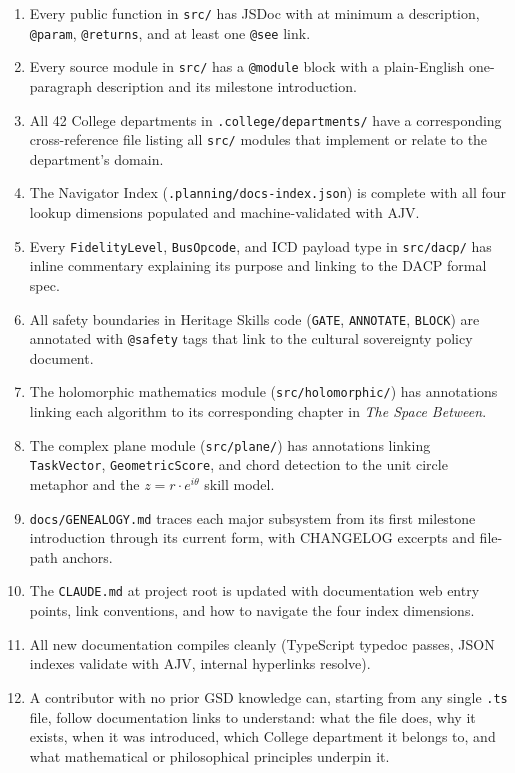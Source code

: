 \documentclass[11pt,letterpaper]{article}
\begin{document}
\begin{enumerate}
  \item Every public function in \texttt{src/} has JSDoc with at minimum a description, \texttt{@param}, \texttt{@returns}, and at least one \texttt{@see} link.
  \item Every source module in \texttt{src/} has a \texttt{@module} block with a plain-English one-paragraph description and its milestone introduction.
  \item All 42 College departments in \texttt{.college/departments/} have a corresponding cross-reference file listing all \texttt{src/} modules that implement or relate to the department's domain.
  \item The Navigator Index (\texttt{.planning/docs-index.json}) is complete with all four lookup dimensions populated and machine-validated with AJV.
  \item Every \texttt{FidelityLevel}, \texttt{BusOpcode}, and ICD payload type in \texttt{src/dacp/} has inline commentary explaining its purpose and linking to the DACP formal spec.
  \item All safety boundaries in Heritage Skills code (\texttt{GATE}, \texttt{ANNOTATE}, \texttt{BLOCK}) are annotated with \texttt{@safety} tags that link to the cultural sovereignty policy document.
  \item The holomorphic mathematics module (\texttt{src/holomorphic/}) has annotations linking each algorithm to its corresponding chapter in \textit{The Space Between}.
  \item The complex plane module (\texttt{src/plane/}) has annotations linking \texttt{TaskVector}, \texttt{GeometricScore}, and chord detection to the unit circle metaphor and the $z = r \cdot e^{i\theta}$ skill model.
  \item \texttt{docs/GENEALOGY.md} traces each major subsystem from its first milestone introduction through its current form, with CHANGELOG excerpts and file-path anchors.
  \item The \texttt{CLAUDE.md} at project root is updated with documentation web entry points, link conventions, and how to navigate the four index dimensions.
  \item All new documentation compiles cleanly (TypeScript typedoc passes, JSON indexes validate with AJV, internal hyperlinks resolve).
  \item A contributor with no prior GSD knowledge can, starting from any single \texttt{.ts} file, follow documentation links to understand: what the file does, why it exists, when it was introduced, which College department it belongs to, and what mathematical or philosophical principles underpin it.
\end{enumerate}
\end{document}
